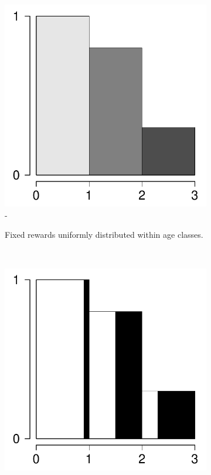 \documentclass{bmcart}
\begin{document}
\begin{figure}
\centering
    \begin{subfigure}[b]{0.4\textwidth}
        \includegraphics[scale=.5]{Figures/fixedflat.pdf}-
        \caption{Fixed rewards uniformly distributed within age classes.}
        \label{fig:c1}
    \end{subfigure}
    ~ 
    \begin{subfigure}[b]{0.4\textwidth}
        \includegraphics[scale=.5]{Figures/fixedbars.pdf}

\end{subfigure}
\end{figure}
\end{document}
